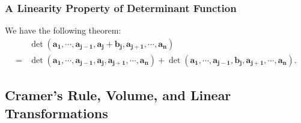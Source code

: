 \documentclass[10pt, a4paper]{article}
\begin{document}
\subsubsection*{A Linearity Property of Determinant Function}
We have the following theorem:
\begin{align*}
    &\det(\mathbf{a_1},\cdots,\mathbf{a_{j-1}},\mathbf{a_j}+\mathbf{b_j},\mathbf{a_{j+1}},\cdots,\mathbf{a_n})\\
     = &\det(\mathbf{a_1},\cdots,\mathbf{a_{j-1}},\mathbf{a_j},\mathbf{a_{j+1}},\cdots,\mathbf{a_n}) + \det(\mathbf{a_1},\cdots,\mathbf{a_{j-1}},\mathbf{b_j},\mathbf{a_{j+1}},\cdots,\mathbf{a_n}).
\end{align*}

\subsection{Cramer's Rule, Volume, and Linear Transformations}
\end{document}
